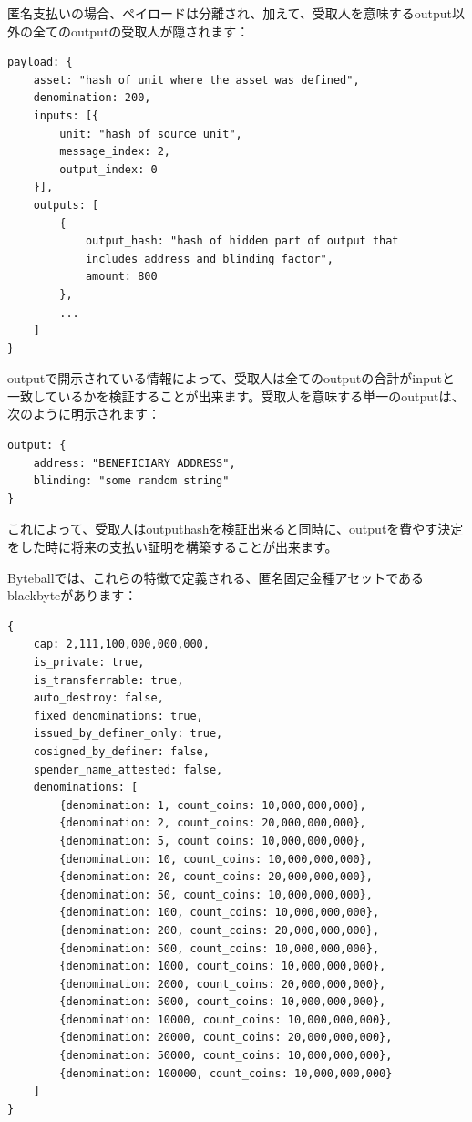 \documentclass[a4paper, dvipdfmx]{jsarticle}
\begin{document}
匿名支払いの場合、ペイロードは分離され、加えて、受取人を意味するoutput以外の全てのoutputの受取人が隠されます：

\begin{lstlisting}[basicstyle=\ttfamily\footnotesize, frame=none]
payload: {
    asset: "hash of unit where the asset was defined",
    denomination: 200,
    inputs: [{
        unit: "hash of source unit",
        message_index: 2,
        output_index: 0
    }],
    outputs: [
        {
            output_hash: "hash of hidden part of output that
            includes address and blinding factor",
            amount: 800
        },
        ...
    ]
}
\end{lstlisting}

\noindent outputで開示されている情報によって、受取人は全てのoutputの合計がinputと一致しているかを検証することが出来ます。受取人を意味する単一のoutputは、次のように明示されます：

\begin{lstlisting}[basicstyle=\ttfamily\footnotesize, frame=none]
output: {
    address: "BENEFICIARY ADDRESS",
    blinding: "some random string"
}
\end{lstlisting}

\noindent これによって、受取人はoutput\textunderscore hashを検証出来ると同時に、outputを費やす決定をした時に将来の支払い証明を構築することが出来ます。

Byteballでは、これらの特徴で定義される、匿名固定金種アセットであるblackbyteがあります：

\begin{lstlisting}[basicstyle=\ttfamily\footnotesize, frame=none]
{
    cap: 2,111,100,000,000,000,
    is_private: true,
    is_transferrable: true,
    auto_destroy: false,
    fixed_denominations: true,
    issued_by_definer_only: true,
    cosigned_by_definer: false,
    spender_name_attested: false,
    denominations: [
        {denomination: 1, count_coins: 10,000,000,000},
        {denomination: 2, count_coins: 20,000,000,000},
        {denomination: 5, count_coins: 10,000,000,000},
        {denomination: 10, count_coins: 10,000,000,000},
        {denomination: 20, count_coins: 20,000,000,000},
        {denomination: 50, count_coins: 10,000,000,000},
        {denomination: 100, count_coins: 10,000,000,000},
        {denomination: 200, count_coins: 20,000,000,000},
        {denomination: 500, count_coins: 10,000,000,000},
        {denomination: 1000, count_coins: 10,000,000,000},
        {denomination: 2000, count_coins: 20,000,000,000},
        {denomination: 5000, count_coins: 10,000,000,000},
        {denomination: 10000, count_coins: 10,000,000,000},
        {denomination: 20000, count_coins: 20,000,000,000},
        {denomination: 50000, count_coins: 10,000,000,000},
        {denomination: 100000, count_coins: 10,000,000,000}
    ]
}
\end{lstlisting}
\end{document}
